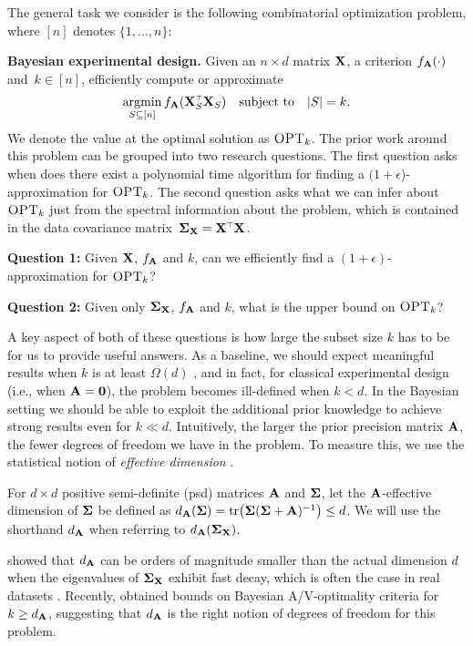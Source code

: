 \documentclass[thesis.tex]{subfiles}
\begin{document}
The general task we consider is the following combinatorial
optimization problem, where $[n]$
denotes $\{1,...,n\}$:

\textbf{Bayesian experimental design.}
Given an $n\times d$ matrix $\mathbf X$,
a criterion $f_{\mathbf A}(\cdot)$ and~$k\in[n]$,
efficiently compute or approximate
\begin{align*}
\argmin_{S \subseteq [n]} f_{\A}(\X_S^\top\X_S)\quad\text{subject
  to}\quad |S|=k.
\end{align*}
We denote the value at the optimal solution as ${\textsc{OPT}_k}$.
The prior work around this problem can be grouped into two research questions.
The first question asks when does there exist a
polynomial time algorithm for finding a $(1+\epsilon$)-approximation
for ${\textsc{OPT}_k}$.
The second question asks what we can
infer about ${\textsc{OPT}_k}$ just from the spectral
information about the problem, which is contained in the
data covariance matrix~$\Sigmab_\X=\X^\top\X$.


\textbf{Question 1:} \quad
Given $\mathbf X$, $f_{\mathbf A}$ and $k$, can we efficiently find a $(1+\epsilon)$-approximation for
${\textsc{OPT}_k}$?

\textbf{Question 2:} \quad
Given only $\mathbf{\Sigma}_{\mathbf X}$, $f_{\mathbf A}$ and $k$,
what is the upper bound on ${\textsc{OPT}_k}$?


A key aspect of both of these questions is how large the subset
size $k$ has to be for us to provide useful answers. As a baseline, we
should expect meaningful results when $k$ is at least $\Omega(d)$ \citep[see
discussion in][]{near-optimal-design}, and in fact,
for classical experimental design (i.e., when $\mathbf A=\mathbf 0$), the problem
becomes ill-defined 
when $k<d$. In the Bayesian setting we should be able to exploit the
additional prior knowledge 
to achieve strong results even for $k\ll d$. Intuitively, the larger
the prior precision matrix $\mathbf A$, the fewer degrees of freedom we have
in the problem. To measure this, we use the statistical notion of
\emph{effective dimension} \citep{ridge-leverage-scores}.
\begin{definition}
For $d\times d$ positive semi-definite (psd) matrices $\mathbf A$ and $\mathbf{\Sigma}$,
  let the $\mathbf A$-effective dimension of $\mathbf{\Sigma}$
be defined as $d_{\mathbf A}(\mathbf{\Sigma}) =
\mathrm{tr}\big(\mathbf{\Sigma}(\mathbf{\Sigma}+\mathbf A)^{-1}\big) \leq d$.
We will use the shorthand $d_{\mathbf A}$ when referring to $d_{\mathbf A}(\mathbf{\Sigma}_{\mathbf X})$.
\end{definition}
\cite{klivans-goel17} showed that $d_\mathbf A$ can be orders of
  magnitude smaller than the 
actual dimension $d$ when the eigenvalues of $\mathbf{\Sigma}_\mathbf X$ exhibit fast
decay, which is often the case in real datasets
\citep{revisiting-nystrom}. Recently,
\cite{regularized-volume-sampling} obtained bounds on Bayesian 
A/V-optimality criteria for $k\geq d_{\mathbf A}$, suggesting that $d_{\mathbf A}$
is the right notion of degrees of freedom for this problem.
\end{document}

